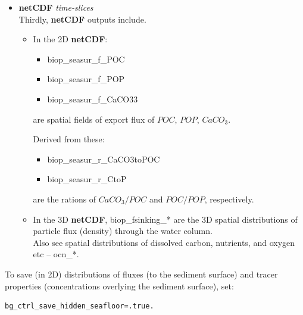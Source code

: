 \begin{itemize}[noitemsep]
\vspace{2mm}
\item \textbf{netCDF} \textit{time-slices}
\vspace{1mm}
\\Thirdly, \textbf{netCDF} outputs include.
\begin{itemize}[noitemsep]
\vspace{1mm}
\item In the 2D \textbf{netCDF}:
\begin{itemize}[noitemsep]
\item [] \textsf{\footnotesize biop\_seasur\_f\_POC}
\item [] \textsf{\footnotesize biop\_seasur\_f\_POP}
\item [] \textsf{\footnotesize biop\_seasur\_f\_CaCO33}
\end{itemize}
are spatial fields of export flux of \(POC\), \(POP\), \(CaCO_{3}\).

\vspace{1mm}
Derived from these:
\begin{itemize}[noitemsep]
\item [] \textsf{\footnotesize biop\_seasur\_r\_CaCO3toPOC}
\item [] \textsf{\footnotesize biop\_seasur\_r\_CtoP}
\end{itemize}
are the rations of \(CaCO_{3}/POC\) and \(POC/POP\), respectively.
\vspace{1mm}
\item In the 3D \textbf{netCDF}, \textsf{\footnotesize biop\_fsinking\_*} are the 3D spatial distributions of particle flux (density) through the water column.
\vspace{1mm}
\\Also see spatial distributions of dissolved carbon, nutrients, and oxygen etc -- \textsf{\footnotesize ocn\_*}.
\end{itemize} 

\end{itemize}

\vspace{2mm}
\noindent To save (in 2D) distributions of fluxes (to the sediment surface) and tracer properties (concentrations overlying the sediment surface), set:

\vspace{-1mm}\small\begin{verbatim}
bg_ctrl_save_hidden_seafloor=.true.
\end{verbatim}\normalsize\vspace{-1mm}

